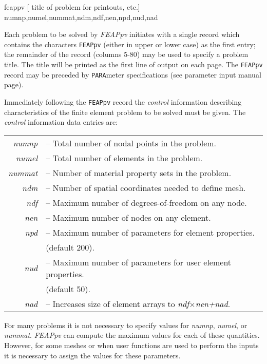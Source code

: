 \hspace{1.0cm} {{ feappv [ title of problem for printouts, etc.]\hfill}}
\\{\smallskip}
\hspace{1.2cm} {{ numnp,numel,nummat,ndm,ndf,nen,npd,nud,nad \hfill}}
\headb

Each problem to be solved by {\sl FEAPpv} initiates with a single record
which contains the characters {\tt FEAPpv} (either in upper or
lower case) as the first
entry; the remainder of the record (columns 5-80) may be used to
specify a problem title.  The title will be printed
as the first line of output on each page.
The {\tt FEAPpv} record may be preceded by {\tt PARA}meter specifications
(see parameter input manual page).

Immediately following the {\tt FEAPpv} record the {\it control}
information describing characteristics of the finite element
problem to be solved must be given.
The {\it control} information data entries are:

\begin{center}
\begin{tabular}{r l}
\it  numnp  &-- Total number of nodal points in the problem. \\
\it  numel  &-- Total number of elements in the problem. \\
\it  nummat &-- Number of material property sets in the problem. \\
\it  ndm    &-- Number of spatial coordinates needed to define mesh. \\
\it  ndf    &-- Maximum number of degrees-of-freedom on any node. \\
\it  nen    &-- Maximum number of nodes on any element. \\
\it  npd    &-- Maximum number of parameters for element properties. \\
            &   \quad (default 200). \\
\it  nud    &-- Maximum number of parameters for user element properties. \\
            &   \quad (default 50). \\
\it  nad    &-- Increases size of element arrays to {\it ndf$\times$nen+nad}. \\
\end{tabular} 
\end{center}
For many problems it is not necessary to specify values for {\it numnp},
{\it numel}, or {\it nummat}.  {\sl FEAPpv} can compute the maximum values for
each of these quantities.  However, for some meshes or when user functions
are used to perform the inputs it is necessary to assign the values for
these parameters.


